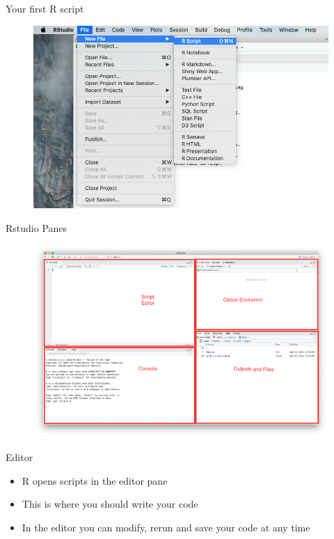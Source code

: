 \documentclass[ignorenonframetext,]{beamer}
\providecommand{\tightlist}{%
  \setlength{\itemsep}{0pt}\setlength{\parskip}{0pt}}
\begin{document}
\begin{frame}{Your first R script}
\protect\hypertarget{your-first-r-script}{}

\begin{figure}
\includegraphics[scale=0.35]{figures/new-script.png}
\end{figure}

\end{frame}

\begin{frame}{Rstudio Panes}
\protect\hypertarget{rstudio-panes}{}

\begin{figure}
\includegraphics[scale=0.18]{figures/panes.png}
\end{figure}

\end{frame}

\begin{frame}{Editor}
\protect\hypertarget{editor}{}

\begin{itemize}
\tightlist
\item
  R opens scripts in the editor pane
\item
  This is where you should write your code
\item
  In the editor you can modify, rerun and save your code at any time
\end{itemize}

\end{frame}
\end{document}
